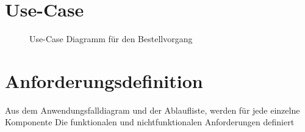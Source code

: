 \section{Use-Case}
\begin{figure}[!ht]
\caption{Use-Case Diagramm für den Bestellvorgang}
\label{fig:use-case}
\end{figure}

\section{Anforderungsdefinition}
Aus dem Anwendungsfalldiagram und der Ablaufliste, werden für jede einzelne Komponente Die funktionalen und nichtfunktionalen Anforderungen definiert
